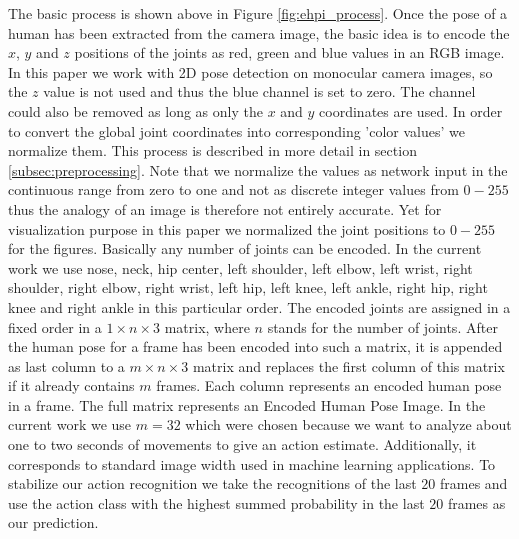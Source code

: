 \documentclass[a4paper, 10pt, conference]{ieeeconf}
\begin{document}
The basic process is shown above in Figure \ref{fig:ehpi_process}. Once the pose of a human has been extracted from the camera image, the basic idea is to encode the $x$, $y$ and $z$ positions of the joints as red, green and blue values in an RGB image. In this paper we work with 2D pose detection on monocular camera images, so the $z$ value is not used and thus the blue channel is set to zero. The channel could also be removed as long as only the $x$ and $y$ coordinates are used. In order to convert the global joint coordinates into corresponding 'color values' we normalize them. This process is described in more detail in section \ref{subsec:preprocessing}. Note that we normalize the values as network input in the continuous range from zero to one and not as discrete integer values from $0-255$ thus the analogy of an image is therefore not entirely accurate. Yet for visualization purpose in this paper we normalized the joint positions to $0-255$ for the figures. Basically any number of joints can be encoded. In the current work we use nose, neck, hip center, left shoulder, left elbow, left wrist, right shoulder, right elbow, right wrist, left hip, left knee, left ankle, right hip, right knee and right ankle in this particular order. The encoded joints are assigned in a fixed order in a $1\times n\times3$ matrix, where $n$ stands for the number of joints. After the human pose for a frame has been encoded into such a matrix, it is appended as last column to a $m\times n\times3$ matrix and replaces the first column of this matrix if it already contains $m$ frames. Each column represents an encoded human pose in a frame. The full matrix represents an Encoded Human Pose Image. In the current work we use $m=32$ which were chosen because we want to analyze about one to two seconds of movements to give an action estimate. Additionally, it corresponds to standard image width used in machine learning applications. To stabilize our action recognition we take the recognitions of the last $20$ frames and use the action class with the highest summed probability in the last $20$ frames as our prediction.
\end{document}

